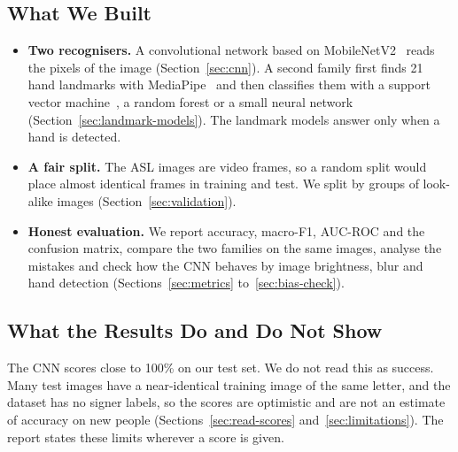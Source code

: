 \subsection{What We Built}

\begin{itemize}
  \item \textbf{Two recognisers.} A convolutional network based on MobileNetV2~\cite{sandler2018mobilenetv2} reads the pixels of the image (Section~\ref{sec:cnn}). A second family first finds 21 hand landmarks with MediaPipe~\cite{zhang2020mediapipe} and then classifies them with a support vector machine~\cite{cortes1995svm}, a random forest or a small neural network (Section~\ref{sec:landmark-models}). The landmark models answer only when a hand is detected.
  \item \textbf{A fair split.} The ASL images are video frames, so a random split would place almost identical frames in training and test. We split by groups of look-alike images (Section~\ref{sec:validation}).
  \item \textbf{Honest evaluation.} We report accuracy, macro-F1, AUC-ROC and the confusion matrix, compare the two families on the same images, analyse the mistakes and check how the CNN behaves by image brightness, blur and hand detection (Sections~\ref{sec:metrics} to~\ref{sec:bias-check}).
\end{itemize}

\subsection{What the Results Do and Do Not Show}

The CNN scores close to 100\% on our test set. We do not read this as success. Many test images have a near-identical training image of the same letter, and the dataset has no signer labels, so the scores are optimistic and are not an estimate of accuracy on new people (Sections~\ref{sec:read-scores} and~\ref{sec:limitations}). The report states these limits wherever a score is given.
